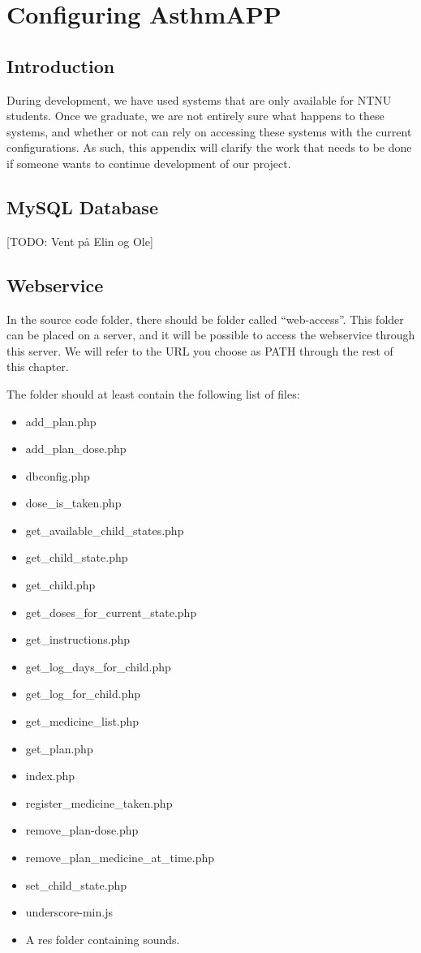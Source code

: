 \chapter{Configuring AsthmAPP}
\label{app:configure-asthmapp}

\section{Introduction}
During development, we have used systems that are only available for NTNU students. Once we graduate, we are not entirely sure what happens to these systems, and whether or not \app{} can rely on accessing these systems with the current configurations. As such, this appendix will clarify the work that needs to be done if someone wants to continue development of our project. 

\section{MySQL Database}

[TODO: Vent p\r{a} Elin og Ole]

\section{Webservice}

In the source code folder, there should be folder called ``web-access''. This folder can be placed on a server, and it will be possible to access the webservice through this server. We will refer to the URL you choose as PATH through the rest of this chapter. 

The folder should at least contain the following list of files:

\begin{itemize}
\itemsep0em
  \item add\_plan.php
  \item add\_plan\_dose.php
  \item dbconfig.php
  \item dose\_is\_taken.php
  \item get\_available\_child\_states.php
  \item get\_child\_state.php
  \item get\_child.php
  \item get\_doses\_for\_current\_state.php
  \item get\_instructions.php
  \item get\_log\_days\_for\_child.php
  \item get\_log\_for\_child.php
  \item get\_medicine\_list.php
  \item get\_plan.php
  \item index.php
  \item register\_medicine\_taken.php
  \item remove\_plan-dose.php
  \item remove\_plan\_medicine\_at\_time.php
  \item set\_child\_state.php
  \item underscore-min.js
  \item A res folder containing sounds. 
\end{itemize}

